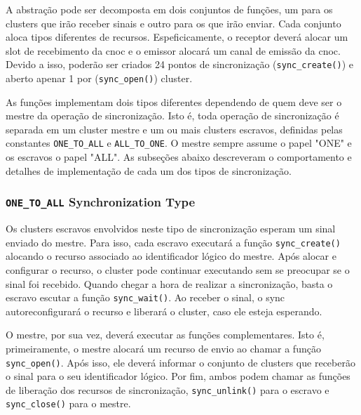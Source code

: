         A abstração \sync pode ser decomposta em dois conjuntos de funções, um para
        os clusters que irão receber sinais e outro para os que irão enviar.
        Cada conjunto aloca tipos diferentes de recursos.
        Espeficicamente, o receptor deverá alocar um slot de recebimento da cnoc
        e o emissor alocará um canal de emissão da cnoc.
        Devido a isso, poderão ser criados 24 pontos de sincronização (\texttt{sync\_create()})
        e aberto apenar 1 por (\texttt{sync\_open()}) cluster.

        As funções implementam dois tipos diferentes dependendo de quem
        deve ser o mestre da operação de sincronização.
        Isto é, toda operação de sincronização é separada em um cluster mestre
        e um ou mais clusters escravos, definidas pelas constantes
        \texttt{ONE\_TO\_ALL} e \texttt{ALL\_TO\_ONE}.
        O mestre sempre assume o papel "ONE" e os escravos o papel "ALL".
        As subseções abaixo descreveram o comportamento e detalhes de implementação
        de cada um dos tipos de sincronização.

            \subsubsection*{\texttt{ONE\_TO\_ALL} Synchronization Type}

                Os clusters escravos envolvidos neste tipo de sincronização esperam
                um sinal enviado do mestre.
                Para isso, cada escravo executará a função \texttt{sync\_create()}
                alocando o recurso associado ao identificador lógico do mestre.
                Após alocar e configurar o recurso, o cluster pode continuar
                executando sem se preocupar se o sinal foi recebido.
                Quando chegar a hora de realizar a sincronização, basta o escravo
                escutar a função \texttt{sync\_wait()}.
                Ao receber o sinal, o sync autoreconfigurará o recurso e liberará o cluster,
                caso ele esteja esperando.

                O mestre, por sua vez, deverá executar as funções complementares.
                Isto é, primeiramente, o mestre alocará um recurso de envio
                ao chamar a função \texttt{sync\_open()}.
                Após isso, ele deverá informar o conjunto de clusters que
                receberão o sinal para o seu identificador lógico.
                Por fim, ambos podem chamar as funções de liberação dos recursos
                de sincronização, \texttt{sync\_unlink()} para o escravo e
                \texttt{sync\_close()} para o mestre.

